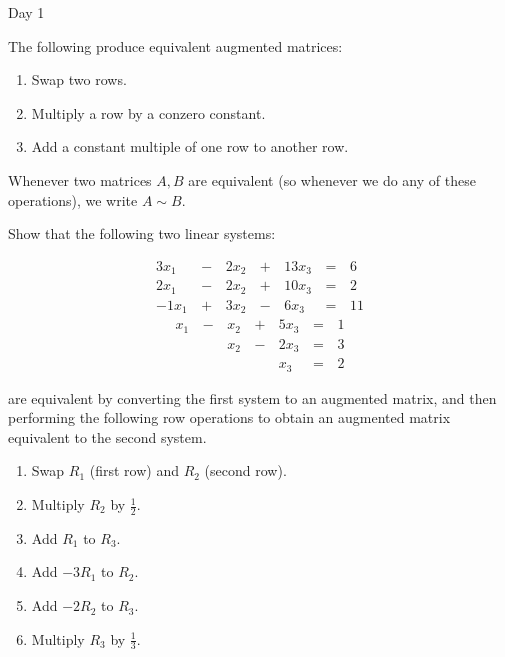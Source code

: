 \begin{applicationActivities}{Day 1}
\begin{definition}
  The following  produce equivalent
  augmented matrices:
  \begin{enumerate}
    \item Swap two rows.
    \item Multiply a row by a conzero constant.
    \item Add a constant multiple of one row to another row.
  \end{enumerate}
  Whenever two matrices \(A,B\) are equivalent (so whenever we do any of
  these operations), we write \(A\sim B\).
\end{definition}

\begin{activity}{0}
  Show that the following two linear systems:
  \begin{multicols}{2}\noindent
    \begin{alignat*}{4}
      3x_1 &\,-\,& 2x_2 &\,+\,& 13x_3 &\,=\,& 6 \\
      2x_1 &\,-\,& 2x_2 &\,+\,& 10x_3 &\,=\,& 2 \\
     -1x_1 &\,+\,& 3x_2 &\,-\,&  6x_3 &\,=\,& 11
    \end{alignat*}
    \begin{alignat*}{4}
       x_1 &\,-\,&  x_2  &\,+\,&  5x_3 &\,=\,& 1 \\
           &\, \,&  x_2 &\,-\,&  2x_3 &\,=\,& 3 \\
           &\, \,&      &\, \,&   x_3 &\,=\,& 2
    \end{alignat*}
  \end{multicols}
  are equivalent by converting the first system to an augmented matrix,
  and then performing the following row operations to obtain
  an augmented matrix equivalent to the second system.
  \begin{multicols}{2}\noindent
  \begin{enumerate}
    \item Swap \(R_1\) (first row) and \(R_2\) (second row).
    \item Multiply \(R_2\) by \(\frac{1}{2}\).
    \item Add \(R_1\) to \(R_3\).
    \item Add \(-3R_1\) to \(R_2\).
    \item Add \(-2R_2\) to \(R_3\).
    \item Multiply \(R_3\) by \(\frac{1}{3}\).
  \end{enumerate}
  \end{multicols}
\end{activity}


\end{applicationActivities}
